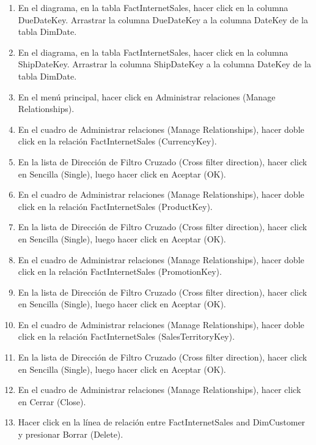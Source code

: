 \begin{enumerate}[1.]
   \item En el diagrama, en la tabla FactInternetSales, hacer click en la columna DueDateKey. Arrastrar la columna
DueDateKey a la columna DateKey de la tabla DimDate.

   \item En el diagrama, en la tabla FactInternetSales, hacer click en la columna ShipDateKey. Arrastrar la
columna ShipDateKey a la columna DateKey de la tabla DimDate.

   \item En el menú principal, hacer click en Administrar relaciones (Manage Relationships).

   \item En el cuadro de Administrar relaciones (Manage Relationships), hacer doble click en la relación
FactInternetSales (CurrencyKey).

   \item En la lista de Dirección de Filtro Cruzado (Cross filter direction), hacer click en Sencilla (Single), luego
hacer click en Aceptar (OK).

   \item En el cuadro de Administrar relaciones (Manage Relationships), hacer doble click en la relación
FactInternetSales (ProductKey).

   \item En la lista de Dirección de Filtro Cruzado (Cross filter direction), hacer click en Sencilla (Single), luego
hacer click en Aceptar (OK).

   \item En el cuadro de Administrar relaciones (Manage Relationships), hacer doble click en la relación
FactInternetSales (PromotionKey).
   \item En la lista de Dirección de Filtro Cruzado (Cross filter direction), hacer click en Sencilla (Single), luego
hacer click en Aceptar (OK).

   \item En el cuadro de Administrar relaciones (Manage Relationships), hacer doble click en la relación
FactInternetSales (SalesTerritoryKey).
   \item En la lista de Dirección de Filtro Cruzado (Cross filter direction), hacer click en Sencilla (Single), luego
hacer click en Aceptar (OK).

   \item En el cuadro de Administrar relaciones (Manage Relationships), hacer click en Cerrar (Close).

   \item Hacer click en la línea de relación entre FactInternetSales and DimCustomer y presionar Borrar (Delete).


\end{enumerate}
